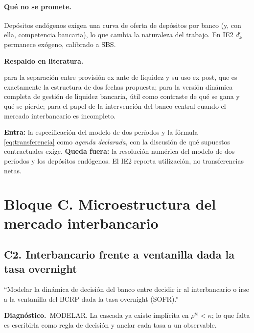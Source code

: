 \documentclass[11pt]{article}
\newcommand{\diag}[1]{\par\noindent\textbf{Diagn\'ostico.}\ #1\par}
\newcommand{\lit}{\par\noindent\textbf{Respaldo en literatura.}\par}
\theoremstyle{definition}
\begin{document}
\paragraph{Qu\'e no se promete.} Dep\'ositos end\'ogenos exigen una curva de oferta
de dep\'ositos por banco (y, con ella, competencia bancaria), lo que cambia la
naturaleza del trabajo. En IE2 $d^c_k$ permanece exógeno, calibrado a SBS.

\lit
\citet{holmstromtirole1998} para la separaci\'on entre provisi\'on ex ante de
liquidez y su uso ex post, que es exactamente la estructura de dos fechas
propuesta; \citet{bianchibigio2022} para la versi\'on din\'amica completa de
gesti\'on de liquidez bancaria, \'util como contraste de qu\'e se gana y qu\'e se
pierde; \citet{allencarlettigale2009} para el papel de la intervenci\'on del banco
central cuando el mercado interbancario es incompleto.

\begin{ie2}
\textbf{Entra:} la especificaci\'on del modelo de dos per\'iodos y la f\'ormula
\eqref{eq:transferencia} como \emph{agenda declarada}, con la discusi\'on de qu\'e
supuestos contractuales exige.
\textbf{Queda fuera:} la resoluci\'on num\'erica del modelo de dos per\'iodos y los
dep\'ositos end\'ogenos. El IE2 reporta utilizaci\'on, no transferencias netas.
\end{ie2}

\section{Bloque C. Microestructura del mercado interbancario}

\subsection{C2. Interbancario frente a ventanilla dada la tasa overnight}
\label{sub:C2}

\begin{jurado}
``Modelar la din\'amica de decisi\'on del banco entre decidir ir al interbancario
o irse a la ventanilla del BCRP dada la tasa overnight (SOFR).''
\end{jurado}

\diag{MODELAR. La cascada ya existe impl\'icita en $\rho^{ib}<\kappa$; lo que falta
es escribirla como regla de decisi\'on y anclar cada tasa a un observable.}
\end{document}
